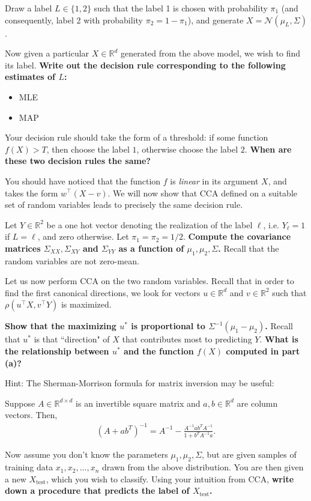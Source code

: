 Draw a label $L \in \{1, 2\}$ such that the label 1 is chosen with probability $\pi_1$ (and consequently, label 2 with probability $\pi_2 = 1 - \pi_1$), and generate $X = \mathcal{N}(\mu_{L}, \Sigma)$.
\begin{Parts}

\Part Now given a particular $X \in \mathbb{R}^d$ generated from the above model, we wish to find its label. {\bf Write out the decision rule corresponding to the following estimates of $L$:}
\begin{itemize} 
\item MLE
\item MAP
\end{itemize}

Your decision rule should take the form of a threshold: if some function $f(X) > T$, then choose the label $1$, otherwise choose the label $2$.
{\bf When are these two decision rules the same?}

\Part You should have noticed that the function $f$ is \emph{linear} in its argument $X$, and takes the form $w^\top (X - v)$. We will now show that CCA defined on a suitable set of random variables leads to precisely the same decision rule.

Let $Y \in \mathbb{R}^2$ be a one hot vector denoting the realization of the label $\ell$, i.e. $Y_\ell = 1$ if $L = \ell$, and zero otherwise.
Let $\pi_1 = \pi_2 = 1/2$. {\bf Compute the covariance matrices $\Sigma_{XX}, \Sigma_{XY}$ and $\Sigma_{YY}$ as a function of $\mu_1, \mu_2, \Sigma$.} Recall that the random variables are not zero-mean.

\Part Let us now perform CCA on the two random variables. Recall that in order to find the first canonical directions, we look for vectors $u \in \mathbb{R}^d$ and $v \in \mathbb{R}^2$ such that $\rho(u^\top X, v^\top Y)$ is maximized.

{\bf Show that the maximizing $u^*$ is proportional to $\Sigma^{-1} (\mu_1 - \mu_2)$.} Recall that $u^*$ is that ``direction" of $X$ that contributes most to predicting $Y$. {\bf What is the relationship between $u^*$ and the function $f(X)$ computed in part (a)?}

Hint: The Sherman-Morrison formula for matrix inversion may be useful:

Suppose $A\in \mathbb {R} ^{d\times d}$ is an invertible square matrix and $a, b\in \mathbb {R}^{d}$ are column vectors. Then,
\begin{align*}
(A+ab^{T})^{-1}=A^{-1}- \frac{A^{-1}ab^{T}A^{-1}}{1+b^{T}A^{-1}a}.
\end{align*}


\Part Now assume you don't know the parameters $\mu_1, \mu_2, \Sigma$, but are given samples of training data $x_1, x_2, \ldots, x_n$ drawn from the above distribution. You are then given a new $X_{\text{test}}$, which you wish to classify. Using your intuition from CCA, {\bf write down a procedure that predicts the label of $X_{\text{test}}$.}
\end{Parts}

